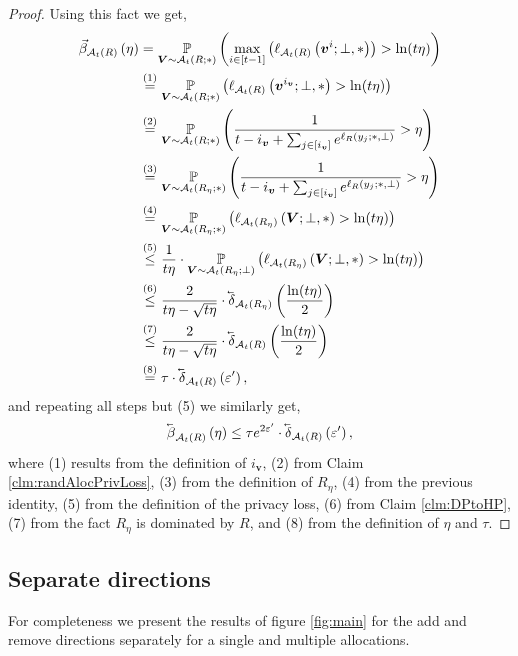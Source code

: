 \documentclass{article}
\theoremstyle{plain}
\theoremstyle{definition}
\newcommand{\eps}{\varepsilon}
\newcommand{\eqExp}[2]{\overset{(#1)}{#2}}
\newcommand{\lvec}[1]{\reflectbox{$\vec{\reflectbox{$#1$}}$}}
\newcommand{\out}{y}
\newcommand{\rand}{R}
\newcommand{\view}{\boldsymbol{v}}
\newcommand{\viewRV}{\boldsymbol{V}}
\newcommand{\prob}[2]{\underset{#1}{\mathbb{P}} \left(#2 \right)}
\newcommand{\lossAlg}[4]{\ell_{#1}\left(#2; #3, #4 \right)}
\newcommand{\alloc}[2]{\mathcal{A}_{#1}\left(#2\right)}
\newcommand{\allocFunc}[3]{\mathcal{A}_{#1}\left(#2; #3\right)}
\newcommand{\add}[1]{\lvec{#1}}
\newcommand{\rem}[1]{\vec{#1}}
\newcommand{\privProfAdd}[1]{\add{\delta}_{#1}}
\begin{document}
\begin{proof}
    Using this fact we get,
    \begin{align*}
        \rem{\beta}_{\alloc{t}{\rand}}\left(\eta \right) & = \prob{\viewRV \sim \allocFunc{t}{\rand}{*}}{\underset{i \in [t-1]}{\max} \left(\lossAlg{\alloc{t}{\rand}}{\view^{i}}{\bot}{*} \right)> \ln(t \eta)}
        \\ & \eqExp{1}{=} \prob{\viewRV \sim \allocFunc{t}{\rand}{*}}{\lossAlg{\alloc{t}{\rand}}{\view^{i_{\view}}}{\bot}{*} > \ln(t \eta)}
        \\ & \eqExp{2}{=} \prob{\viewRV \sim \allocFunc{t}{\rand}{*}}{\frac{1}{t-i_{\view} + \sum_{j \in [i_{\view}]} e^{\lossAlg{\rand}{\out_{j}}{*}{\bot}}} > \eta}
        \\ & \eqExp{3}{=} \prob{\viewRV \sim \allocFunc{t}{\rand_{\eta}}{*}}{\frac{1}{t-i_{\view} + \sum_{j \in [i_{\view}]} e^{\lossAlg{\rand}{\out_{j}}{*}{\bot}}} > \eta}
        \\ & \eqExp{4}{=} \prob{\viewRV \sim \allocFunc{t}{\rand_{\eta}}{*}}{\lossAlg{\alloc{t}{\rand_{\eta}}}{\viewRV}{\bot}{*} > \ln(t \eta)}
        \\ & \eqExp{5}{\le} \frac{1}{t \eta} \cdot \prob{\viewRV \sim \allocFunc{t}{\rand_{\eta}}{\bot}}{\lossAlg{\alloc{t}{\rand_{\eta}}}{\viewRV}{\bot}{*} > \ln(t \eta)}
        \\ & \eqExp{6}{\le} \frac{2}{t \eta - \sqrt{t \eta}} \cdot \privProfAdd{\alloc{t}{\rand_{\eta}}}\left(\frac{\ln(t \eta)}{2}\right)
        \\ & \eqExp{7}{\le} \frac{2}{t \eta - \sqrt{t \eta}} \cdot \privProfAdd{\alloc{t}{\rand}}\left(\frac{\ln(t \eta)}{2}\right)
        \\ & \eqExp{8}{=} \tau \cdot \privProfAdd{\alloc{t}{\rand}}\left(\eps' \right),
    \end{align*}
    and repeating all steps but (5) we similarly get,
    \[
        \add{\beta}_{\alloc{t}{\rand}}\left(\eta \right) \le \tau e^{2 \eps'} \cdot \privProfAdd{\alloc{t}{\rand}}\left(\eps' \right),
    \]
    where (1) results from the definition of $i_{\view}$, (2) from Claim \ref{clm:randAlocPrivLoss}, (3) from the definition of $\rand_{\eta}$, (4) from the previous identity, (5) from the definition of the privacy loss, (6) from Claim \ref{clm:DPtoHP}, (7) from the fact $\rand_{\eta}$ is dominated by $\rand$, and (8) from the definition of $\eta$ and $\tau$.
\end{proof}

\subsection{Separate directions}
For completeness we present the results of figure \ref{fig:main} for the add and remove directions separately for a single and multiple allocations.
\end{document}
